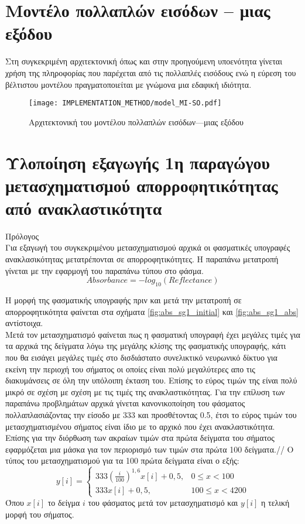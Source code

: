 \section{Μοντέλο πολλαπλών εισόδων -- μιας εξόδου}
Στη συγκεκριμένη αρχιτεκτονική όπως και στην προηγούμενη υποενότητα γίνεται χρήση της πληροφορίας που παρέχεται από τις πολλαπλές εισόδους ενώ η εύρεση του βέλτιστου μοντέλου πραγματοποιείται με γνώμονα μια εδαφική ιδιότητα.
\begin{figure}[H]
  \begin{center}
    \texttt{[image: IMPLEMENTATION\_METHOD/model\_MI-SO.pdf]}
    \caption{Αρχιτεκτονική του μοντέλου πολλαπλών εισόδων---μιας εξόδου}
  \end{center}
\end{figure}
\section{Υλοποίηση εξαγωγής 1η παραγώγου μετασχηματισμού  απορροφητικότητας από ανακλαστικότητα}
Πρόλογος\\
Για εξαγωγή του συγκεκριμένου μετασχηματισμού αρχικά οι φασματικές υπογραφές ανακλασικότητας μετατρέπονται σε απορροφητικότητες. Η παραπάνω μετατροπή γίνεται με την εφαρμογή του παραπάνω τύπου στο φάσμα.
$$Absorbance=-log_{10}(Reflectance)$$

Η μορφή της φασματικής υπογραφής πριν και μετά την μετατροπή σε απορροφητικότητα φαίνεται στα σχήματα \ref{fig:abs_sg1_initial} και \ref{fig:abs_sg1_abs} αντίστοιχα.\\

Μετά τον μετασχηματισμό  φαίνεται πως η φασματική υπογραφή έχει μεγάλες τιμές για τα αρχικά της δείγματα λόγω της μεγάλης κλίσης της φασματικής υπογραφής, κάτι που θα εισάγει μεγάλες τιμές στο δισδιάστατο συνελικτικό νευρωνικό δίκτυο για εκείνη την περιοχή του σήματος οι οποίες είναι πολύ μεγαλύτερες απο τις διακυμάνσεις σε όλη την υπόλοιπη έκταση του. Επίσης το εύρος τιμών της είναι πολύ μικρό σε σχέση με σχέση με τις τιμές της ανακλαστικότητας. Για την επίλυση των παραπάνω προβλημάτων αρχικά γίνεται κανονικοποίηση του φάσματος πολλαπλασιάζοντας την είσοδο με 333 και προσθέτοντας 0.5, έτσι το εύρος τιμών του μετασχηματισμένου σήματος είναι ίδιο με το αρχικό που έχει ανακλαστικότητα. Επίσης για την διόρθωση των ακραίων τιμών στα πρώτα δείγματα του σήματος εφαρμόζεται μια μάσκα για τον περιορισμό των τιμών στα πρώτα 100 δείγματα.//
Ο τύπος του μετασχηματισμού για τα 100 πρώτα δείγματα είναι ο εξής:
\[
    y[i]= 
\begin{cases}
    333\left(\frac{i}{100}\right)^{1,6}x[i]+0,5,& 0\leq x<100\\
    333 x[i]+0,5,              & 100\leq x<4200
\end{cases}
\]
Όπου $x[i]$ το δείγμα $i$ του φάσματος μετά τον μετασχηματισμό  και $y[i]$ η τελική μορφή του σήματος.\\

